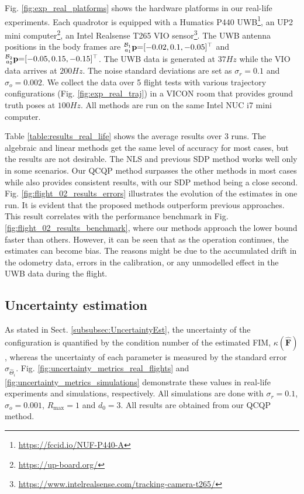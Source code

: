 \documentclass[journal]{IEEEtran}
\def\FIM{\mathbf{F}}
\def\condF{\kappa(\hat{\FIM})}
\begin{document}
Fig. \ref{fig:exp_real_platforms} shows the hardware platforms in our real-life experiments. Each quadrotor is equipped with a Humatics P440 UWB\footnote{\url{https://fccid.io/NUF-P440-A}}, an UP2 mini computer\footnote{\url{https://up-board.org/}}, an Intel Realsense T265 VIO sensor\footnote{\url{https://www.intelrealsense.com/tracking-camera-t265/}}. The UWB antenna positions in the body frames are $\prescript{\mathcal{B}_1}{a_1}{\mathbf{p}} {=} [-0.02, 0.1, -0.05]^\top$ and $\prescript{\mathcal{B}_2}{a_2}{\mathbf{p}} {=} [-0.05, 0.15, -0.15]^\top$. The UWB data is generated at $37\si{Hz}$ while the VIO data arrives at $200\si{Hz}$. The noise standard deviations are set as $\sigma_r = 0.1$ and $\sigma_o = 0.002$. We collect the data over 5 flight tests with various trajectory configurations (Fig. \ref{fig:exp_real_traj}) in a VICON room that provides ground truth poses at $100\si{Hz}$. All methods are run on the same Intel NUC i7 mini computer.

Table \ref{table:results_real_life} shows the average results over 3 runs. The algebraic and linear methods get the same level of accuracy for most cases, but the results are not desirable. The NLS and previous SDP method works well only in some scenarios. Our QCQP method surpasses the other methods in most cases while also provides consistent results, with our SDP method being a close second.
Fig. \ref{fig:flight_02_results_errors} illustrates the evolution of the estimates in one run. It is evident that the proposed methods outperform previous approaches.
This result correlates with the performance benchmark in Fig. \ref{fig:flight_02_results_benchmark}, where our methods approach the lower bound faster than others. However, it can be seen that as the operation continues, the estimates can become bias. The reasons might be due to the accumulated drift in the odometry data, errors in the calibration, or any unmodelled effect in the UWB data during the flight.

\subsection{Uncertainty estimation} \label{subsec:UncertaintyEval}

As stated in Sect. \ref{subsubsec:UncertaintyEst}, the uncertainty of the configuration is quantified by the condition number of the estimated FIM, $\condF$, whereas the uncertainty of each parameter is measured by the standard error $\sigma_{\hat{\Theta}_i}$. Fig. \ref{fig:uncertainty_metrics_real_flights} and  \ref{fig:uncertainty_metrics_simulations} demonstrate these values in real-life experiments and simulations, respectively. All simulations are done with $\sigma_r = 0.1$, $\sigma_o = 0.001$, $R_{\max} = 1$ and $d_0 = 3$. All results are obtained from our QCQP method.
\end{document}
